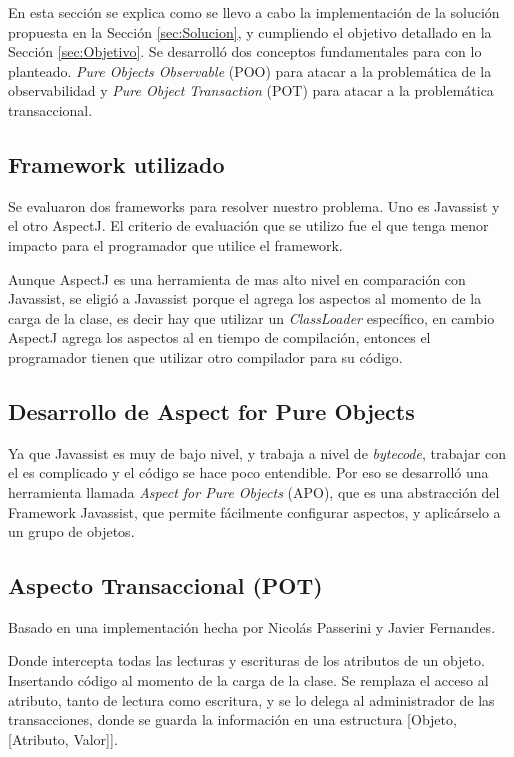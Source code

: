 En esta sección se explica como se llevo a cabo la implementación de la solución
propuesta en la Sección \ref{sec:Solucion}, y cumpliendo el objetivo detallado
en la Sección \ref{sec:Objetivo}. Se desarrolló dos conceptos fundamentales
para con lo planteado. \emph{Pure Objects Observable} (POO)  para atacar a la
problemática de la observabilidad y \emph{Pure Object Transaction} (POT) para
atacar a la problemática transaccional.
	
	\subsection{Framework utilizado}  

	Se evaluaron dos frameworks para resolver nuestro problema. Uno es Javassist y
	el otro AspectJ. \cite{KiczalesHHKPG01}
	El criterio de evaluación que se utilizo fue el que tenga menor impacto para el
	programador que utilice el framework.

	\medskip 
	Aunque AspectJ es una herramienta de mas alto nivel en comparación con
	Javassist,  se eligió a  Javassist porque el agrega los aspectos al momento de
	la carga de la clase, es decir hay que utilizar un \emph{ClassLoader}
	específico, en cambio AspectJ agrega los aspectos al en tiempo de compilación,
	entonces el programador tienen que utilizar otro compilador para su código.

	\medskip 

	\subsection{Desarrollo de Aspect for Pure Objects}

	Ya que Javassist es muy de bajo nivel, y trabaja a nivel de \emph{bytecode},
	trabajar con el es complicado y el código se hace poco entendible. Por eso se
	desarrolló una herramienta llamada \emph{ Aspect for Pure Objects} (APO), que
	es una abstracción del Framework Javassist, que permite fácilmente configurar 
	aspectos, y aplicárselo a un grupo de objetos.

	\subsection{Aspecto Transaccional (POT)} 
		Basado en una implementación
		hecha por Nicolás Passerini y Javier Fernandes.
		 
		Donde intercepta todas las lecturas	y escrituras de los atributos de un
		objeto.	Insertando código al momento de la carga de la clase.
		Se remplaza el acceso al atributo, tanto de lectura como escritura, y se lo
		delega al administrador de las transacciones, donde se guarda la información
		en una estructura [Objeto, [Atributo, Valor]].
		
